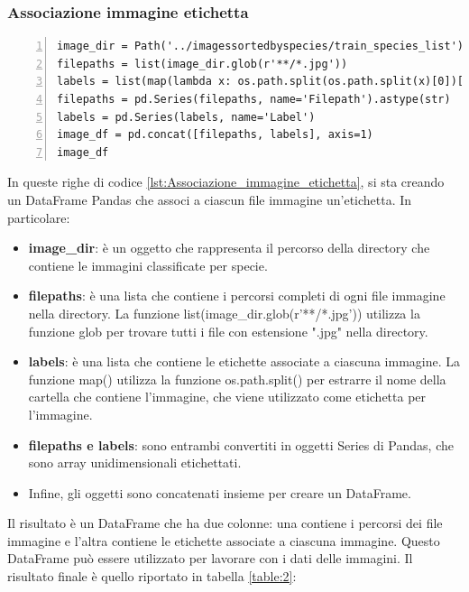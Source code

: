 \documentclass[a4paper,final,12pt]{report}
\begin{document}
\subsubsection{Associazione immagine etichetta}
\begin{lstlisting}[caption={Associazione immagini alle relative etichette.}, label={lst:Associazione_immagine_etichetta}, breaklines, escapechar=`\%, frame=lines, basicstyle=\small\ttfamily, keepspaces=true, numbers=left]
image_dir = Path('../imagessortedbyspecies/train_species_list')
filepaths = list(image_dir.glob(r'**/*.jpg'))
labels = list(map(lambda x: os.path.split(os.path.split(x)[0])[1], filepaths))
filepaths = pd.Series(filepaths, name='Filepath').astype(str)
labels = pd.Series(labels, name='Label')
image_df = pd.concat([filepaths, labels], axis=1)
image_df
\end{lstlisting}
In queste righe di codice \ref{lst:Associazione_immagine_etichetta}, si sta creando un DataFrame Pandas che associ a ciascun file immagine un'etichetta. In particolare:
\begin{itemize}
    \item \textbf{image\_dir}: è un oggetto che rappresenta il percorso della directory che contiene le immagini classificate per specie.
    \item \textbf{filepaths}: è una lista che contiene i percorsi completi di ogni file immagine nella directory. La funzione list(image\_dir.glob(r'**/*.jpg')) utilizza la funzione glob per trovare tutti i file con estensione ".jpg" nella directory.
    \item \textbf{labels}: è una lista che contiene le etichette associate a ciascuna immagine. La funzione map()  utilizza la funzione os.path.split() per estrarre il nome della cartella che contiene l'immagine, che viene utilizzato come etichetta per l'immagine.
    \item \textbf{filepaths e labels}: sono entrambi convertiti in oggetti Series di Pandas, che sono array unidimensionali etichettati.
    \item Infine, gli oggetti sono concatenati insieme per creare un DataFrame.
\end{itemize}
Il risultato è un DataFrame che ha due colonne: una contiene i percorsi dei file immagine e l'altra contiene le etichette associate a ciascuna immagine. Questo DataFrame può essere utilizzato per lavorare con i dati delle immagini. Il risultato finale è quello riportato in tabella \ref{table:2}:
\end{document}
